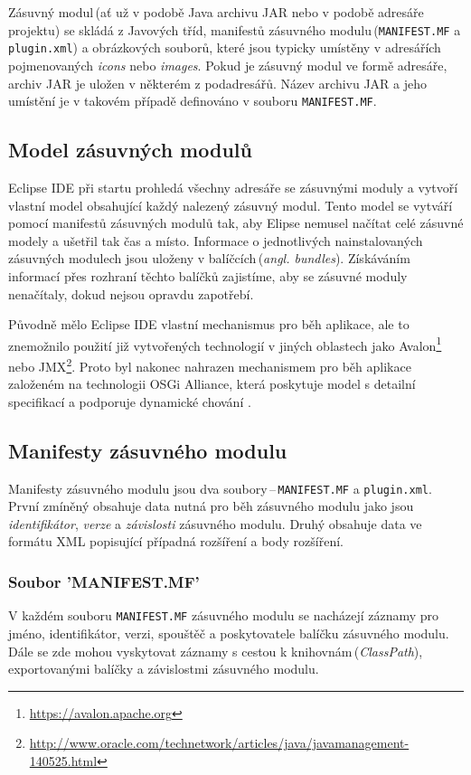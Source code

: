   Zásuvný modul\,(ať už v podobě Java archivu JAR nebo v podobě adresáře projektu) se skládá z Javových tříd, manifestů zásuvného modulu\,(\texttt{MANIFEST.MF} a \texttt{plugin.xml}) a obrázkových souborů, které jsou typicky umístěny v adresářích pojmenovaných \emph{icons} nebo \emph{images}. Pokud je zásuvný modul ve formě adresáře, archiv JAR je uložen v některém z podadresářů. Název archivu JAR a jeho umístění je v takovém případě definováno v souboru \texttt{MANIFEST.MF}.

    \subsection{Model zásuvných modulů}
    Eclipse IDE při startu prohledá všechny adresáře se zásuvnými moduly a vytvoří vlastní model obsahující každý nalezený zásuvný modul. Tento model se vytváří pomocí manifestů zásuvných modulů tak, aby Elipse nemusel načítat celé zásuvné modely a ušetřil tak čas a místo. Informace o jednotlivých nainstalovaných zásuvných modulech jsou uloženy v balíčcích\,(\emph{angl. bundles}). Získáváním informací přes rozhraní těchto balíčků zajistíme, aby se zásuvné moduly nenačítaly, dokud nejsou opravdu zapotřebí.

    Původně mělo Eclipse IDE vlastní mechanismus pro běh aplikace, ale to znemožnilo použití již vytvořených technologií v jiných oblastech jako Avalon\footnote{\url{https://avalon.apache.org}} nebo JMX\footnote{\url{http://www.oracle.com/technetwork/articles/java/javamanagement-140525.html}}. Proto byl nakonec nahrazen mechanismem pro běh aplikace založeném na technologii OSGi Alliance, která poskytuje model s detailní specifikací a podporuje dynamické chování \cite{Plugins}.

    \subsection{Manifesty zásuvného modulu}
    Manifesty zásuvného modulu jsou dva soubory\,--\,\texttt{MANIFEST.MF} a \texttt{plugin.xml}. První zmíněný obsahuje data nutná pro běh zásuvného modulu jako jsou \emph{identifikátor}, \emph{verze} a \emph{závislosti} zásuvného modulu. Druhý obsahuje data ve formátu XML popisující případná rozšíření a body rozšíření.

      \subsubsection{Soubor 'MANIFEST.MF'}
      V každém souboru \texttt{MANIFEST.MF} zásuvného modulu se nacházejí záznamy pro jméno, identifikátor, verzi, spouštěč a poskytovatele balíčku zásuvného modulu. Dále se zde mohou vyskytovat záznamy s cestou k knihovnám\,(\emph{ClassPath}), exportovanými balíčky a závislostmi zásuvného modulu.

